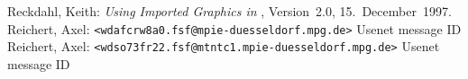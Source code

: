 \documentclass{article}
\begin{document}
\begin{thebibliography}{99}

  Reckdahl, Keith: \emph{Using Imported Graphics in \LaTeXe},
                      Version~2.0, 15.~December~1997.
  Reichert, Axel:
                      \hbox{\verb|<wdafcrw8a0.fsf@mpie-duesseldorf.mpg.de>|}
                      Usenet message ID
 Reichert, Axel:
                      \hbox{\verb|<wdso73fr22.fsf@mtntc1.mpie-duesseldorf.mpg.de>|}
                      Usenet message ID

\end{thebibliography}
\end{document}
